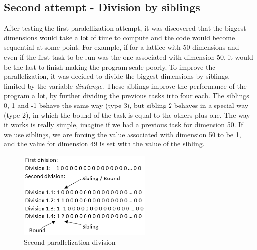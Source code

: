 \documentclass[conference]{IEEEtran}
\begin{document}
\subsection{Second attempt - Division by siblings}
After testing the first paralellization attempt, it was discovered that the biggest dimensions would take a lot of time to compute and the code would become sequential at some point. For example, if for a lattice with 50 dimensions and even if the first task to be run was the one associated with dimension 50, it would be the last to finish making the program scale poorly.
To improve the parallelization, it was decided to divide the biggest dimensions by siblings, limited by the variable \emph{divRange}. These siblings improve the performance of the program a lot, by further dividing the previous tasks into four each. The siblings  0, 1 and -1 behave the same way (type 3), but sibling 2 behaves in a special way (type 2), in  which the bound of the task is equal to the others plus one. The way it works is really simple, imagine if we had a previous task for dimension 50. If we use siblings, we are forcing the value associated with dimension 50 to be 1, and the value for dimension 49 is set with the value of the sibling. 

\begin{figure}[ht!]
\centering
\includegraphics[width=65mm]{imgParallel/SegundaParalelizacao}
\caption{Second parallelization division}
\end{figure}
\end{document}
